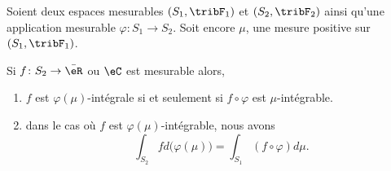 \begin{theorem}      \label{THOooVADUooLiRfGK}
    Soient deux espaces mesurables \( (S_1,\tribF_1)\) et \( (S_2,\tribF_2)\) ainsi qu'une application mesurable \( \varphi\colon S_1\to S_2\). Soit encore \( \mu\), une mesure positive sur \( (S_1,\tribF_1)\).

    Si \( f\colon S_2\to\bar \eR\) ou \( \eC\) est mesurable alors,
    \begin{enumerate}
        \item      \label{ItemooKMBIooZpHJSS}
            \( f\) est \( \varphi(\mu)\)-intégrale si et seulement si \( f\circ\varphi\) est \( \mu\)-intégrable.
        \item       \label{ItemooLAPYooUreDEl}
            dans le cas où \( f\) est \( \varphi(\mu)\)-intégrable, nous avons
            \begin{equation}        \label{EqooSOHXooXSbdoy}
                \int_{S_2}fd\big( \varphi(\mu) \big)=\int_{S_1}(f\circ\varphi)d\mu.
            \end{equation}
    \end{enumerate}
\end{theorem}

